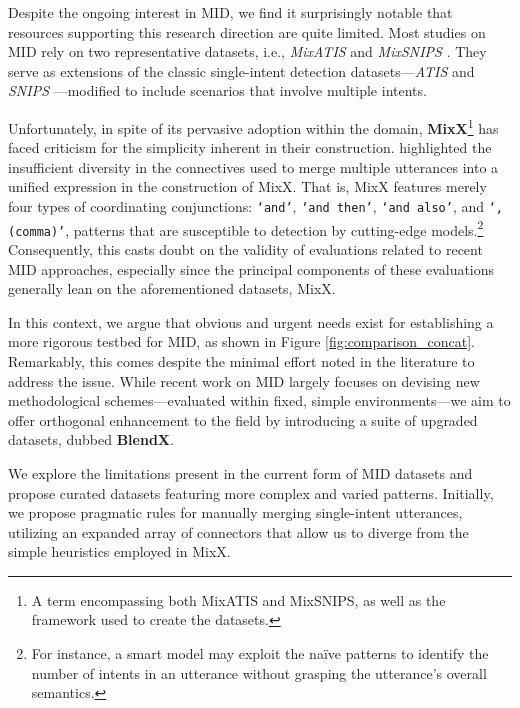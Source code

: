Despite the ongoing interest in MID, we find it surprisingly notable that resources supporting this research direction are quite limited.
Most studies on MID rely on two representative datasets, i.e., \textit{MixATIS} and \textit{MixSNIPS} .
They serve as extensions of the classic single-intent detection datasets---\textit{ATIS}  and \textit{SNIPS} ---modified to include scenarios that involve multiple intents.

Unfortunately, in spite of its pervasive adoption within the domain, \textbf{MixX}\footnote{A term encompassing both MixATIS and MixSNIPS, as well as the framework used to create the datasets.}  has faced criticism for the simplicity inherent in their construction.
\citet{larson2022survey} highlighted the insufficient diversity in the connectives used to merge multiple utterances into a unified expression in the construction of MixX.
That is, MixX features merely four types of coordinating conjunctions: \texttt{`and'}, \texttt{`and then'}, \texttt{`and also'}, and \texttt{`,(comma)'}, patterns that are susceptible to detection by cutting-edge models.\footnote{For instance, a smart model may exploit the na\"ive patterns to identify the number of intents in an utterance without grasping the utterance's overall semantics.}
Consequently, this casts doubt on the validity of evaluations related to recent MID approaches, especially since the principal components of these evaluations generally lean on the aforementioned datasets, MixX.

In this context, we argue that obvious and urgent needs exist for establishing a more rigorous testbed for MID, as shown in Figure \ref{fig:comparison_concat}.
Remarkably, this comes despite the minimal effort noted in the literature to address the issue.
While recent work on MID largely focuses on devising new methodological schemes---evaluated within fixed, simple environments---we aim to offer orthogonal enhancement to the field by introducing a suite of upgraded datasets, dubbed \textbf{BlendX}.

We explore the limitations present in the current form of MID datasets and propose curated datasets featuring more complex and varied patterns.
Initially, we propose pragmatic rules for manually merging single-intent utterances, utilizing an expanded array of connectors that allow us to diverge from the simple heuristics employed in MixX.

